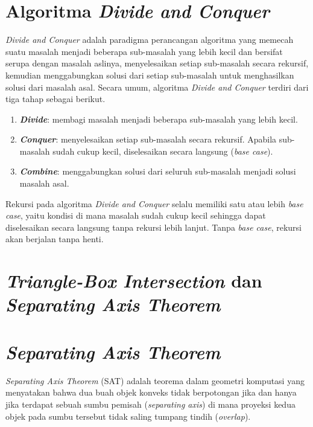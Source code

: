 \section{Algoritma \textit{Divide and Conquer}}

\textit{Divide and Conquer} adalah paradigma perancangan algoritma yang memecah
suatu masalah menjadi beberapa sub-masalah yang lebih kecil dan bersifat serupa
dengan masalah aslinya, menyelesaikan setiap sub-masalah secara rekursif, kemudian
menggabungkan solusi dari setiap sub-masalah untuk menghasilkan solusi dari
masalah asal. Secara umum, algoritma \textit{Divide and Conquer} terdiri dari
tiga tahap sebagai berikut.

\begin{enumerate}
    \item \textbf{\textit{Divide}}: membagi masalah menjadi beberapa sub-masalah
          yang lebih kecil.

    \item \textbf{\textit{Conquer}}: menyelesaikan setiap sub-masalah secara
          rekursif. Apabila sub-masalah sudah cukup kecil, diselesaikan secara langsung
          (\textit{base case}).

    \item \textbf{\textit{Combine}}: menggabungkan solusi dari seluruh sub-masalah
          menjadi solusi masalah asal.
\end{enumerate}

Rekursi pada algoritma \textit{Divide and Conquer} selalu memiliki satu atau lebih
\textit{base case}, yaitu kondisi di mana masalah sudah cukup kecil sehingga dapat
diselesaikan secara langsung tanpa rekursi lebih lanjut. Tanpa \textit{base case},
rekursi akan berjalan tanpa henti.

\section{\textit{Triangle-Box Intersection} dan \textit{Separating Axis Theorem}}

\section{\textit{Separating Axis Theorem}}

\textit{Separating Axis Theorem} (SAT) adalah teorema dalam geometri komputasi
yang menyatakan bahwa dua buah objek konveks tidak berpotongan jika dan hanya jika
terdapat sebuah sumbu pemisah (\textit{separating axis}) di mana proyeksi kedua
objek pada sumbu tersebut tidak saling tumpang tindih (\textit{overlap}).

